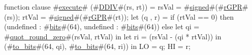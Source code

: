 function clause #\hyperref[zexecute]{execute}# (#\hyperref[zDDIV]{DDIV}#(rs, rt)) =
  {
    rsVal = #\hyperref[zsigned]{signed}#(#\hyperref[zrGPR]{rGPR}#(rs));
    rtVal = #\hyperref[zsigned]{signed}#(#\hyperref[zrGPR]{rGPR}#(rt));
    let (q , r) =
      if (rtVal == 0)
        then (undefined : #\hyperref[zbits]{bits}#(64), undefined : #\hyperref[zbits]{bits}#(64))
      else
        let qi = #\hyperref[zquotzyroundzyzzero]{quot\_round\_zero}#(rsVal, rtVal) in
        let ri = (rsVal - (qi * rtVal)) in
	(#\hyperref[ztozybits]{to\_bits}#(64, qi), #\hyperref[ztozybits]{to\_bits}#(64, ri)) in
    {
      LO    = q;
      HI    = r;
    }
  }
